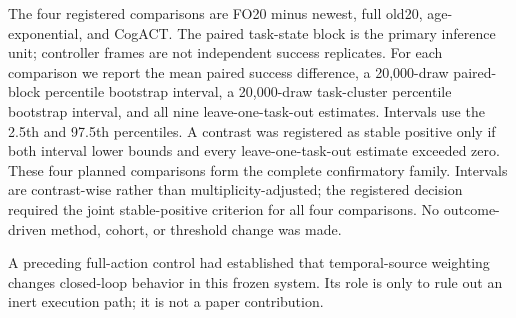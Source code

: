 The four registered comparisons are FO20 minus newest, full old20,
age-exponential, and CogACT. The paired task-state block is the primary
inference unit; controller frames are not independent success replicates. For
each comparison we report the mean paired success difference, a 20,000-draw
paired-block percentile bootstrap interval, a 20,000-draw task-cluster
percentile bootstrap interval, and all nine leave-one-task-out estimates.
Intervals use the 2.5th and 97.5th percentiles. A contrast was registered as
stable positive only if both interval lower bounds and every leave-one-task-out
estimate exceeded zero. These four planned comparisons form the complete
confirmatory family. Intervals are contrast-wise rather than
multiplicity-adjusted; the registered decision required the joint
stable-positive criterion for all four comparisons. No outcome-driven method,
cohort, or threshold change was made.

A preceding full-action control had established that temporal-source weighting
changes closed-loop behavior in this frozen system. Its role is only to rule
out an inert execution path; it is not a paper contribution.
